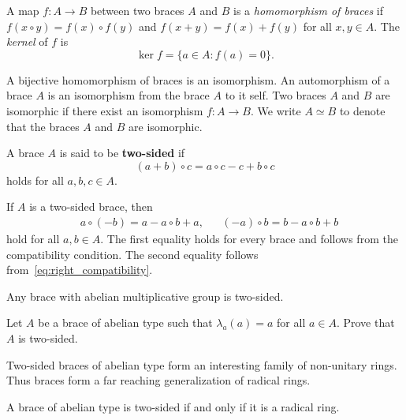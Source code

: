 \begin{definition}
 	A map $f\colon A\to B$ between two braces $A$ and $B$ is a {\em homomorphism of braces} 
 	if $f(x\circ y)=f(x)\circ f(y)$ and $f(x+y)=f(x)+f(y)$ for all $x,y\in A$.  The \emph{kernel} of $f$ is
     \[
         \ker f=\{a\in A:f(a)=0\}.
     \]
 \end{definition}

A bijective homomorphism of braces is an isomorphism. An automorphism of a brace $A$ is an isomorphism from the brace $A$ to it self. Two braces $A$ and $B$ are isomorphic if there exist an isomorphism $f\colon A\rightarrow B$. We write $A\simeq B$ to denote that the braces $A$ and $B$ are isomorphic.

\begin{definition}
	A brace $A$ is said to be \textbf{two-sided} if 
	\begin{equation}
	\label{eq:right_compatibility}
	(a+b)\circ c=a\circ c-c+b\circ c
	\end{equation}
	holds for all $a,b,c\in A$. 
\end{definition}

If $A$ is a two-sided brace, then 
\begin{align}
\label{eq:2sided}
&a\circ(-b)=a-a\circ b+a,
&&(-a)\circ b=b-a\circ b+b    
\end{align}
hold for all $a,b\in A$. The first equality holds for every brace and follows 
from the compatibility condition. 
The second equality follows from~\eqref{eq:right_compatibility}. 

\begin{example}
  Any brace with abelian multiplicative group is 
  two-sided.
\end{example}

\begin{exercise}
\label{xca:2sided}
	Let $A$ be a brace of abelian type such that $\lambda_a(a)=a$ for all $a\in A$.
	Prove that $A$ is two-sided.
\end{exercise}

Two-sided braces of abelian type form an interesting family of non-unitary rings.
Thus braces form a far reaching generalization of radical rings. 

\begin{theorem}[Rump]
\label{thm:radical}
    A brace of abelian type is two-sided if and only if it is a radical ring. 
\end{theorem}


